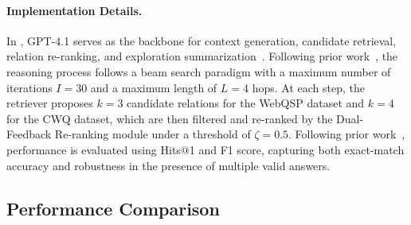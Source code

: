 

\paragraph{Implementation Details.}

In \method{}, GPT-4.1 serves as the backbone for context generation, candidate retrieval, relation re-ranking, and exploration summarization~\citep{liu2023evaluating}. Following prior work~\cite{sun2023think, ma2024think}, the reasoning process follows a beam search paradigm with a maximum number of iterations $I=30$ and a maximum length of $L=4$ hops. At each step, the retriever proposes $k=3$ candidate relations for the WebQSP dataset and $k=4$ for the CWQ dataset, which are then filtered and re-ranked by the Dual-Feedback Re-ranking module under a threshold of $\zeta=0.5$. Following prior work~\citep{luo2023reasoning,wang2025dynamically,ma2025deliberation}, performance is evaluated using Hits@1 and F1 score, capturing both exact-match accuracy and robustness in the presence of multiple valid answers.



\subsection{Performance Comparison}

